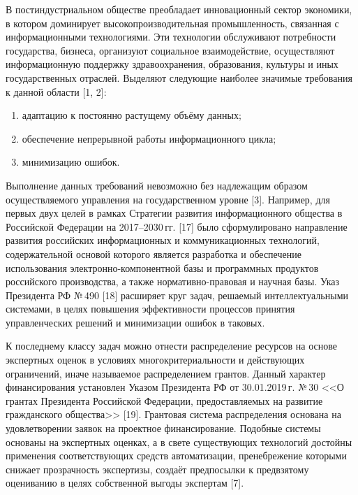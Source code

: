  

\makeProcTitleRazdel
{}

В постиндустриальном обществе преобладает инновационный сектор экономики, в котором доминирует высокопроизводительная промышленность, связанная с информационными технологиями. Эти технологии обслуживают потребности государства, бизнеса, организуют социальное взаимодействие, осуществляют информационную поддержку здравоохранения, образования, культуры и иных государственных отраслей. Выделяют следующие наиболее значимые требования к данной области [1, 2]:
\begin{enumerate}[noitemsep]\vspace{-8pt}
      \item адаптацию к постоянно растущему объёму данных;
      \item обеспечение непрерывной работы информационного цикла;
      \item минимизацию ошибок.
\end{enumerate}\vspace{-8pt}

Выполнение данных требований невозможно без надлежащим образом осуществляемого управления на государственном уровне [3]. Например, для первых двух целей в рамках Стратегии развития информационного общества в Российской Федерации на 2017--2030\,гг. [17] было сформулировано направление развития российских информационных и коммуникационных технологий, содержательной основой которого является разработка и обеспечение использования электронно-компонентной базы и программных продуктов российского производства, а также нормативно-правовая и научная базы. Указ Президента РФ №\,490 [18] расширяет круг задач, решаемый интеллектуальными системами, в целях повышения эффективности процессов принятия управленческих решений и минимизации ошибок в таковых.

К последнему классу задач можно отнести распределение ресурсов на основе экспертных оценок в условиях многокритериальности и действующих ограничений, иначе называемое распределением грантов. Данный характер финансирования установлен Указом Президента РФ от 30.01.2019\,г. №\,30 <<О грантах Президента Российской Федерации, предоставляемых на развитие гражданского общества>> [19]. Грантовая система распределения основана на удовлетворении заявок на проектное финансирование. Подобные системы основаны на экспертных оценках, а в свете существующих технологий достойны применения соответствующих средств автоматизации, пренебрежение которыми снижает прозрачность экспертизы, создаёт предпосылки к предвзятому оцениванию в целях собственной выгоды экспертам [7].

